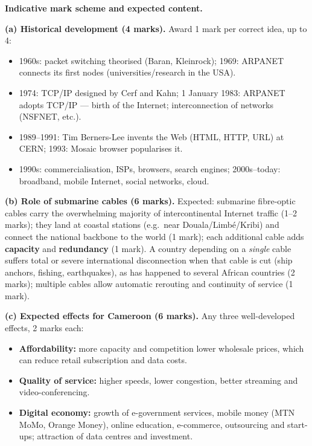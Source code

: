 \documentclass[11pt]{article}
\begin{document}
\begin{corrige}
\textbf{Indicative mark scheme and expected content.}

\textbf{(a) Historical development (4 marks).} Award 1 mark per correct idea, up to 4:
\begin{itemize}
\item 1960s: packet switching theorised (Baran, Kleinrock); 1969: ARPANET connects its first nodes (universities/research in the USA).
\item 1974: TCP/IP designed by Cerf and Kahn; 1 January 1983: ARPANET adopts TCP/IP — birth of the Internet; interconnection of networks (NSFNET, etc.).
\item 1989--1991: Tim Berners-Lee invents the Web (HTML, HTTP, URL) at CERN; 1993: Mosaic browser popularises it.
\item 1990s: commercialisation, ISPs, browsers, search engines; 2000s--today: broadband, mobile Internet, social networks, cloud.
\end{itemize}

\textbf{(b) Role of submarine cables (6 marks).} Expected: submarine fibre-optic cables carry the overwhelming majority of intercontinental Internet traffic (1--2 marks); they land at coastal stations (e.g.\ near Douala/Limb\'e/Kribi) and connect the national backbone to the world (1 mark); each additional cable adds \textbf{capacity} and \textbf{redundancy} (1 mark). A country depending on a \emph{single} cable suffers total or severe international disconnection when that cable is cut (ship anchors, fishing, earthquakes), as has happened to several African countries (2 marks); multiple cables allow automatic rerouting and continuity of service (1 mark).

\textbf{(c) Expected effects for Cameroon (6 marks).} Any three well-developed effects, 2 marks each:
\begin{itemize}
\item \textbf{Affordability:} more capacity and competition lower wholesale prices, which can reduce retail subscription and data costs.
\item \textbf{Quality of service:} higher speeds, lower congestion, better streaming and video-conferencing.
\item \textbf{Digital economy:} growth of e-government services, mobile money (MTN MoMo, Orange Money), online education, e-commerce, outsourcing and start-ups; attraction of data centres and investment.
\end{itemize}


\end{corrige}
\end{document}
